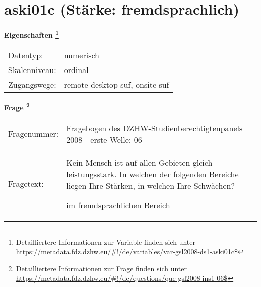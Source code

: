 
    \setcounter{footnote}{0}

    \vspace*{-1.8cm}
	\section{aski01c (Stärke: fremdsprachlich)}
	\label{section:aski01c}



    \vspace*{0.5cm}
    \noindent\textbf{Eigenschaften
	\footnote{Detailliertere Informationen zur Variable finden sich unter
		\url{https://metadata.fdz.dzhw.eu/\#!/de/variables/var-gsl2008-ds1-aski01c$}}}\\
	\begin{tabularx}{\hsize}{@{}lX}
	Datentyp: & numerisch \\
	Skalenniveau: & ordinal \\
	Zugangswege: &
	  remote-desktop-suf, 
	  onsite-suf
 \\
    \end{tabularx}



				\vspace*{0.5cm}
                \noindent\textbf{Frage
	                \footnote{Detailliertere Informationen zur Frage finden sich unter
		              \url{https://metadata.fdz.dzhw.eu/\#!/de/questions/que-gsl2008-ins1-06$}}}\\
				\begin{tabularx}{\hsize}{@{}lX}
					Fragenummer: &
					  Fragebogen des DZHW-Studienberechtigtenpanels 2008 - erste Welle:
					  06
 \\
					Fragetext: & Kein Mensch ist auf allen Gebieten gleich leistungsstark. In welchen der folgenden Bereiche liegen Ihre Stärken, in welchen Ihre Schwächen?\par  im fremdsprachlichen Bereich \\
				\end{tabularx}





